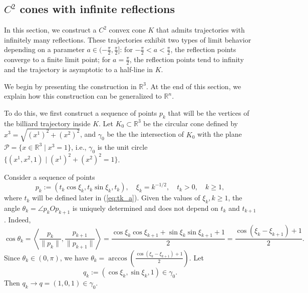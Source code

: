 \documentclass[12pt]{article}
\begin{document}
\subsection{$C^2$ cones with infinite reflections}
  In this section, we construct a $C^2$ convex cone $K$ that admits trajectories with infinitely many reflections.
These trajectories exhibit two types of limit behavior depending on a parameter 
$a \in (-\frac{\pi}{2}, \frac{\pi}{2}]$: for $-\frac{\pi}{2} < a < \frac{\pi}{2}$, the reflection points converge to a finite limit point; for $a = \frac{\pi}{2}$, the reflection points tend to infinity and the trajectory is asymptotic to a half-line in $K$.


We begin by presenting the construction in $\mathbb{R}^3$.
At the end of this section, we explain how this construction can be generalized to $\mathbb{R}^n$.


To do this, we first construct a sequence of points $p_k$ that will be the vertices of the billiard trajectory inside $K$.
Let $K_0 \subset \mathbb{R}^3$ be the circular cone defined by
$x^3 = \sqrt{(x^1)^2 + (x^2)^2}$, 
and $\gamma_0$ be the 
the intersection of $K_0$ with the plane $\mathcal{P} = \{x \in \mathbb{R}^3 \mid x^3 = 1\}$, 
i.e., $\gamma_0$ is the unit circle $\{(x^1,x^2,1)\mid (x^1)^2 + (x^2)^2 = 1\}$. 


Consider a sequence of points
\begin{equation}\label{eq:def-of-pk}
  p_k := (t_k \cos \xi_k, t_k \sin \xi_k, t_k),
\quad \xi_k = k^{-1/2},
\quad t_k >0,
\quad k\geq 1,
\end{equation}
where $t_k$ will be defined later in (\ref{eq:tk_a}).
Given the values of $\xi_k, k\geq 1$, the angle $\theta_k=\angle p_k O p_{k+1}$ is uniquely determined and 
does not depend on $t_k$ and $t_{k+1}$.
Indeed, 
\begin{equation}\label{eq:xi-theta-0}
\cos \theta_k = \left\langle \frac{p_k}{\|p_k\|}, \frac{p_{k+1}}{\|p_{k+1}\|} \right\rangle 
= \frac{\cos \xi_{k}\cos \xi_{k+1} + \sin \xi_k \sin \xi_{k+1} + 1}{2}
= \frac{\cos (\xi_k - \xi_{k+1}) + 1 }{2} 
.
\end{equation}
Since $\theta_k \in (0,\pi)$, we have
$
\theta_k = \arccos \left(\frac{\cos (\xi_k - \xi_{k+1})+1}{2}\right).
$
Let 
$$
q_k := ( \cos \xi_k, \sin \xi_k, 1) \in \gamma_0.
$$
Then $q_k \to q= (1,0,1) \in \gamma_0$.
\end{document}
